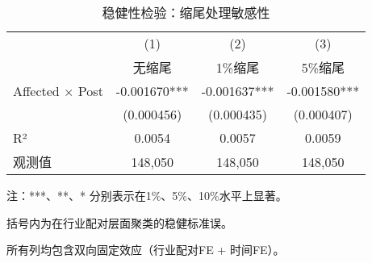 \begin{table}[htbp]
\centering
\begin{threeparttable}
\caption{稳健性检验：缩尾处理敏感性}
\label{tab:robustness_winsorize}
\begin{tabular}{lccc}
\hline\hline
 & (1) & (2) & (3) \\
 & 无缩尾 & 1\%缩尾 & 5\%缩尾 \\
\hline
Affected $\times$ Post & -0.001670*** & -0.001637*** & -0.001580*** \\
 & (0.000456) & (0.000435) & (0.000407) \\
\hline
R² & 0.0054 & 0.0057 & 0.0059 \\
观测值 & 148,050 & 148,050 & 148,050 \\
\hline\hline
\end{tabular}
\begin{tablenotes}
\small
\item 注：***、**、* 分别表示在1\%、5\%、10\%水平上显著。
\item 括号内为在行业配对层面聚类的稳健标准误。
\item 所有列均包含双向固定效应（行业配对FE + 时间FE）。
\end{tablenotes}
\end{threeparttable}
\end{table}